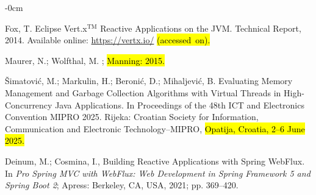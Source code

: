 \documentclass[software,article,accept,pdftex,moreauthors]{Definitions/mdpi}
\begin{document}
\begin{adjustwidth}{-\extralength}{0cm}
\begin{thebibliography}{999}
Fox, T.
\newblock Eclipse Vert.x$^{\text{TM}}$ Reactive Applications on the JVM.
\newblock Technical Report, 2014. Available online: \url{https://vertx.io/} \hl{(accessed~on).}

Maurer, N.; Wolfthal, M.
; \hl{Manning: 2015.} %


{\v{S}}imatovi{\'c}, M.; Markulin, H.; Beroni{\'c}, D.; Mihaljevi{\'c}, B.
\newblock Evaluating Memory Management and Garbage Collection Algorithms with
  Virtual Threads in High-Concurrency Java Applications.
\newblock In Proceedings of the 48th ICT and Electronics Convention MIPRO 2025. Rijeka: Croatian Society for Information, Communication and Electronic Technology–MIPRO, \hl{Opatija, Croatia, 2--6 June 2025.} %


Deinum, M.; Cosmina, I., Building Reactive Applications with Spring WebFlux.
\newblock In {\em Pro Spring MVC with WebFlux: Web Development in Spring
  Framework 5 and Spring Boot 2}; Apress: Berkeley, CA, USA, 2021; pp. 369--420.

\end{thebibliography}



	\PublishersNote{}
\end{adjustwidth}
\end{document}
